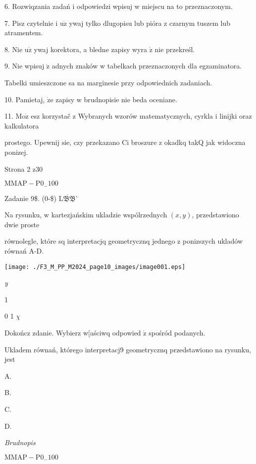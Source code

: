 \documentclass[a4paper,12pt]{article}
\begin{document}
6. Rozwiqzania zadań i odpowiedzi wpisuj w miejscu na to przeznaczonym.

7. Pisz czytelnie i $\mathrm{u}\dot{\mathrm{z}}$ ywaj tylko dlugopisu lub pióra z czarnym tuszem lub atramentem.

8. Nie $\mathrm{u}\dot{\mathrm{z}}$ ywaj korektora, a bledne zapisy wyra $\acute{\mathrm{z}}$ nie przekreśl.

9. Nie wpisuj $\dot{\mathrm{z}}$ adnych znaków w tabelkach przeznaczonych dla egzaminatora.

Tabelki umieszczone sa na marginesie przy odpowiednich zadaniach.

10. Pamietaj, $\dot{\mathrm{z}}\mathrm{e}$ zapisy w brudnopisie nie beda oceniane.

11. $\mathrm{M}\mathrm{o}\dot{\mathrm{z}}$ esz korzystač z Wybranych wzorów matematycznych, cyrkla i linijki oraz kalkulatora

prostego. Upewnij $\mathrm{s}\mathrm{i}\mathrm{e}$, czy przekazano Ci broszure z $\mathrm{o}\mathrm{k}$adkq takQ jak widoczna ponizej.

Strona 2 z30

$\mathrm{M}\mathrm{M}\mathrm{A}\mathrm{P}-\mathrm{P}0_{-}100$





Zadanie 9{\$}. (0-{\$}) $\overline{\mathrm{L}\mathfrak{B}\mathfrak{B}}$'

Na rysunku, w kartezjańskim ukladzie wspólrzednych $(x,y)$, przedstawiono dwie proste

równolegle, które sq interpretacjq geometrycznq jednego z ponizszych ukladów równań A-D.
\begin{center}
\texttt{[image: ./F3\_M\_PP\_M2024\_page10\_images/image001.eps]}
\end{center}
{\it y}

1

0  1  $\chi$

Dokończ zdanie. Wybierz w[aściwq odpowied $\acute{\mathrm{z}}$ spośród podanych.

Ukladem równań, którego interpretacj9 geometrycznq przedstawiono na rysunku, jest

A. 

B. 

C. 

D. 

{\it Brudnopis}

$\mathrm{M}\mathrm{M}\mathrm{A}\mathrm{P}-\mathrm{P}0_{-}100$
\end{document}
